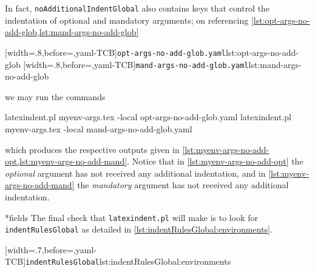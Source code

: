  \begin{example}
 In fact, \texttt{noAdditionalIndentGlobal} also contains keys that control the
 indentation of optional and mandatory arguments; on referencing
 \cref{lst:opt-args-no-add-glob,lst:mand-args-no-add-glob}

 \begin{cmhtcbraster}
  [width=.8\linewidth,before=\centering,yaml-TCB]{\texttt{opt-args-no-add-glob.yaml}}{lst:opt-args-no-add-glob}
  [width=.8\linewidth,before=\centering,yaml-TCB]{\texttt{mand-args-no-add-glob.yaml}}{lst:mand-args-no-add-glob}
 \end{cmhtcbraster}

 we may run the commands 

 \begin{commandshell}
latexindent.pl myenv-args.tex -local opt-args-no-add-glob.yaml
latexindent.pl myenv-args.tex -local mand-args-no-add-glob.yaml
\end{commandshell}

 which produces the respective outputs given in
 \cref{lst:myenv-args-no-add-opt,lst:myenv-args-no-add-mand}. Notice that in
 \cref{lst:myenv-args-no-add-opt} the \emph{optional} argument has not received any
 additional indentation, and in \cref{lst:myenv-args-no-add-mand} the \emph{mandatory}
 argument has not received any additional indentation.

 \begin{cmhtcbraster}
 \end{cmhtcbraster}
 \end{example}

*{fields}
 The final check that \texttt{latexindent.pl} will make is to look for
 \texttt{indentRulesGlobal} as detailed in \cref{lst:indentRulesGlobal:environments}.

 [width=.7\linewidth,before=\centering,yaml-TCB]{\texttt{indentRulesGlobal}}{lst:indentRulesGlobal:environments}

